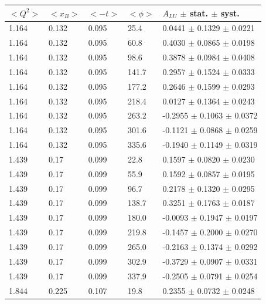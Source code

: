 \begin{table}[!h]
   \begin{center}
      \begin{tabular}{||l|l|l|l|l||}
         \hline
 $<Q^{2}>$ & $<x_{B}>$ & $<-t>$ & $<\phi>$ & $A_{LU}$ $\pm$ stat. $\pm$ syst.\\
         \hline

  1.164 & 0.132 & 0.095 & 25.4  &  0.0441 $\pm$ 0.1329 $\pm$ 0.0221 \\
  1.164 & 0.132 & 0.095 & 60.8  &  0.4030 $\pm$ 0.0865 $\pm$ 0.0198 \\
  1.164 & 0.132 & 0.095 & 98.6  &  0.3878 $\pm$ 0.0984 $\pm$ 0.0408 \\
  1.164 & 0.132 & 0.095 & 141.7 &  0.2957 $\pm$ 0.1524 $\pm$ 0.0333 \\
  1.164 & 0.132 & 0.095 & 177.2 &  0.2646 $\pm$ 0.1599 $\pm$ 0.0293 \\
  1.164 & 0.132 & 0.095 & 218.4 &  0.0127 $\pm$ 0.1364 $\pm$ 0.0243 \\
  1.164 & 0.132 & 0.095 & 263.2 & -0.2955 $\pm$ 0.1063 $\pm$ 0.0372 \\
  1.164 & 0.132 & 0.095 & 301.6 & -0.1121 $\pm$ 0.0868 $\pm$ 0.0259 \\
  1.164 & 0.132 & 0.095 & 335.6 & -0.1940 $\pm$ 0.1149 $\pm$ 0.0319 \\
   \hline                                                             
  1.439 & 0.17 & 0.099 &  22.8  &  0.1597 $\pm$ 0.0820 $\pm$ 0.0230 \\
  1.439 & 0.17 & 0.099 &  55.9  &  0.1592 $\pm$ 0.0857 $\pm$ 0.0195 \\
  1.439 & 0.17 & 0.099 &  96.7  &  0.2178 $\pm$ 0.1320 $\pm$ 0.0295 \\
  1.439 & 0.17 & 0.099 &  138.7 &  0.3251 $\pm$ 0.1763 $\pm$ 0.0187 \\
  1.439 & 0.17 & 0.099 &  180.0 & -0.0093 $\pm$ 0.1947 $\pm$ 0.0197 \\
  1.439 & 0.17 & 0.099 &  219.8 & -0.1457 $\pm$ 0.2000 $\pm$ 0.0270 \\
  1.439 & 0.17 & 0.099 &  265.0 & -0.2163 $\pm$ 0.1374 $\pm$ 0.0292 \\
  1.439 & 0.17 & 0.099 &  302.9 & -0.3729 $\pm$ 0.0907 $\pm$ 0.0331 \\
  1.439 & 0.17 & 0.099 &  337.9 & -0.2505 $\pm$ 0.0791 $\pm$ 0.0254 \\
   \hline                                                             
  1.844 & 0.225 & 0.107 & 19.8  &  0.2355 $\pm$ 0.0732 $\pm$ 0.0248 \\

\end{tabular}
\end{center}
\end{table}

